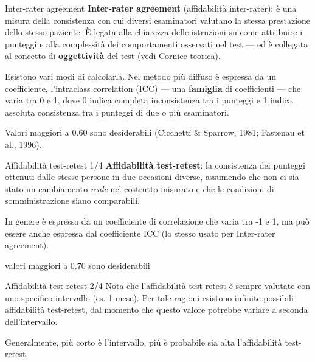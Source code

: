 \documentclass[
  ignorenonframetext,
  aspectratio=169,
]{beamer}
\begin{document}
\begin{frame}{Inter-rater agreement}
\label{inter-rater-agreement}
\textbf{Inter-rater agreement} (affidabilità inter-rater): è una misura
della consistenza con cui diversi esaminatori valutano la stessa
prestazione dello stesso paziente. È legata alla chiarezza delle
istruzioni su come attribuire i punteggi e alla complessità dei
comportamenti osservati nel test --- ed è collegata al concetto di
\textbf{oggettività} del test (vedi Cornice teorica).

Esistono vari modi di calcolarla. Nel metodo più diffuso è espressa da
un coefficiente, l'intraclass correlation (ICC) --- una
\textbf{famiglia} di coefficienti --- che varia tra 0 e 1, dove 0 indica
completa inconsistenza tra i punteggi e 1 indica assoluta consistenza
tra i punteggi di due o più esaminatori.

Valori maggiori a 0.60 sono desiderabili (Cicchetti \& Sparrow, 1981;
Fastenau et al., 1996).
\end{frame}

\begin{frame}{Affidabilità test-retest 1/4}
\label{affidabilituxe0-test-retest-14}
\textbf{Affidabilità test-retest}: la consistenza dei punteggi ottenuti
dalle stesse persone in due occasioni diverse, assumendo che non ci sia
stato un cambiamento \emph{reale} nel costrutto misurato e che le
condizioni di somministrazione siano comparabili.

In genere è espressa da un coefficiente di correlazione che varia tra -1
e 1, ma può essere anche espressa dal coefficiente ICC (lo stesso usato
per Inter-rater agreement).

valori maggiori a 0.70 sono desiderabili
\end{frame}

\begin{frame}{Affidabilità test-retest 2/4}
\label{affidabilituxe0-test-retest-24}
Nota che l'affidabilità test-retest è sempre valutate con uno specifico
intervallo (es. 1 mese). Per tale ragioni esistono infinite possibili
affidabilità test-retest, dal momento che questo valore potrebbe variare
a seconda dell'intervallo.

Generalmente, più corto è l'intervallo, più è probabile sia alta
l'affidabilità test-retest.
\end{frame}
\end{document}
